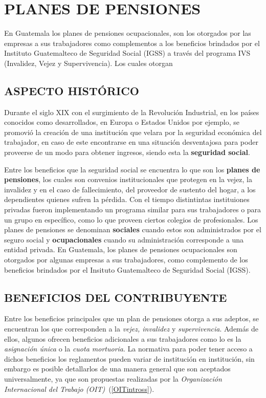 \chapter{PLANES DE PENSIONES }

En Guatemala los planes de pensiones ocupacionales, son los otorgados por las empresas a sus trabajadores como complementos a los beneficios brindados por el Instituto Guatemalteco de Seguridad Social (IGSS) a través del programa IVS (Invalidez, Vejez y Supervivencia). Los cuales otorgan 


\section{ASPECTO HISTÓRICO}

Durante el siglo XIX con el surgimiento de la Revolución Industrial, en los países conocidos como desarrollados, en Europa o Estados Unidos por ejemplo,  se promovió la creación de una institución que velara por la seguridad económica del trabajador, en caso de este encontrarse en una situación desventajosa para poder proveerse de un modo para obtener ingresos, siendo esta la \textbf{seguridad social}. 

Entre los beneficios que la seguridad social se encuentra lo que son los \textbf{planes de pensiones}, los cuales son convenios institucionales que protegen en la vejez, la invalidez y en el caso de fallecimiento, del proveedor de sustento del hogar, a los dependientes quienes sufren la pérdida. Con el tiempo distintintas instituiones privadas fueron implementando un programa similar para sus trabajadores o para un grupo en específico, como lo que proveen ciertos colegios de profesionales. Los planes de pensiones se denominan \textbf{sociales} cuando estos son administrados por el seguro social y \textbf{ocupacionales} cuando su administración corresponde a una entidad privada.  En Guatemala, los planes de pensiones ocupacionales son otorgados por algunas empresas a sus trabajadores, como complemento de los beneficios brindados por el Insituto Guatemalteco de Seguridad Social (IGSS). 

\section{BENEFICIOS DEL CONTRIBUYENTE}

Entre los beneficios principales que un plan de pensiones otorga a sus adeptos, se encuentran los que corresponden a la \textit{vejez, invalidez} y \textit{supervivencia}. Además de ellos, algunos ofrecen beneficios adicionales a sus trabajadores como lo es la \textit{asignación única} o la \textit{cuota mortuoria}. La normativa para poder tener acceso a dichos beneficios los reglamentos pueden variar de institución en institución, sin embargo es posible detallarlos de una manera general que son aceptados universalmente, ya que son propuestas realizadas por la \textit{Organización Internacional del Trabajo (OIT)}~(\ref{OITintross}).

